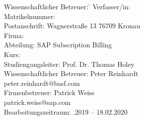 \begin{titlepage}
\begin{center}
\begin{minipage}{\textwidth}
\begin{tabbing}
	Wissenschaftlicher Betreuer: \hspace{0.85cm}\=\kill
	Verfasser/in: \> \DerAutorDerArbeit \\[1.5mm]
	Matrikelnummer:  \\[1.5mm]
	Postanschrift: \> Wagnerstraße 13 76709 Kronau  \\[1.5mm]
	Firma: \> \DerNameDerFirma  \\[1.5mm]
	Abteilung: \> SAP Subscription Billing \\[1.5mm]
	Kurs: \> \DieKursbezeichnung \\[1.5mm]
	Studiengangsleiter: \>Prof. Dr. Thomas Holey  \\[1.5mm]
	Wissenschaftlicher Betreuer: \> Peter Reinhardt \\
	\> peter.reinhardt@basf.com \\
	Firmenbetreuer: \> Patrick Weiss \\
	\> patrick.weiss@sap.com \\
	Bearbeitungszeitraum: .2019 -- 18.02.2020
\end{tabbing}
\end{minipage}

\end{center}

\end{titlepage}